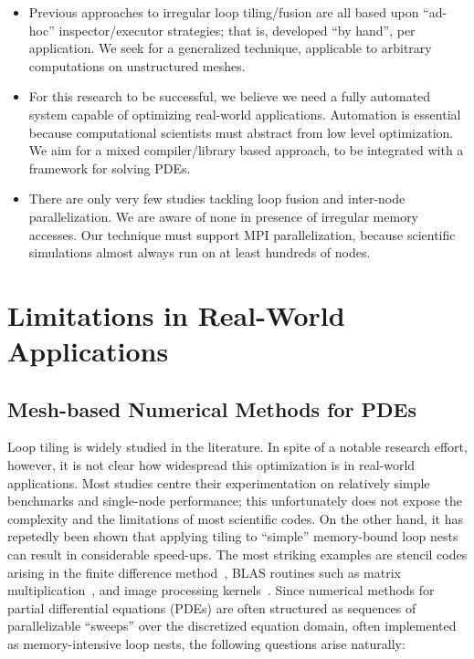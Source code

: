 \begin{itemize}
\item Previous approaches to irregular loop tiling/fusion are all based upon ``ad-hoc'' inspector/executor strategies; that is, developed ``by hand'', per application. We seek for a generalized technique, applicable to arbitrary computations on unstructured meshes.
\item For this research to be successful, we believe we need a fully automated system capable of optimizing real-world applications. Automation is essential because computational scientists must abstract from low level optimization. We aim for a mixed compiler/library based approach, to be integrated with a framework for solving PDEs.
\item There are only very few studies tackling loop fusion and inter-node parallelization. We are aware of none in presence of irregular memory accesses. Our technique must support MPI parallelization, because scientific simulations almost always run on at least hundreds of nodes.
\end{itemize}




\section{Limitations in Real-World Applications}
\label{sec:tiling:limits}

\subsection{Mesh-based Numerical Methods for PDEs}
Loop tiling is widely studied in the literature. In spite of a notable research effort, however, it is not clear how widespread this optimization is in real-world applications. Most studies centre their experimentation on relatively simple benchmarks and single-node performance; this unfortunately does not expose the complexity and the limitations of most scientific codes. On the other hand, it has repetedly been shown that applying tiling to ``simple'' memory-bound loop nests can result in considerable speed-ups. The most striking examples are stencil codes arising in the finite difference method~\cite{stencil-tiling}, BLAS routines such as matrix multiplication~\cite{MKL}, and image processing kernels~\cite{Halide}. Since numerical methods for partial differential equations (PDEs) are often structured as sequences of parallelizable ``sweeps'' over the discretized equation domain, often implemented as memory-intensive loop nests, the following questions arise naturally: 

